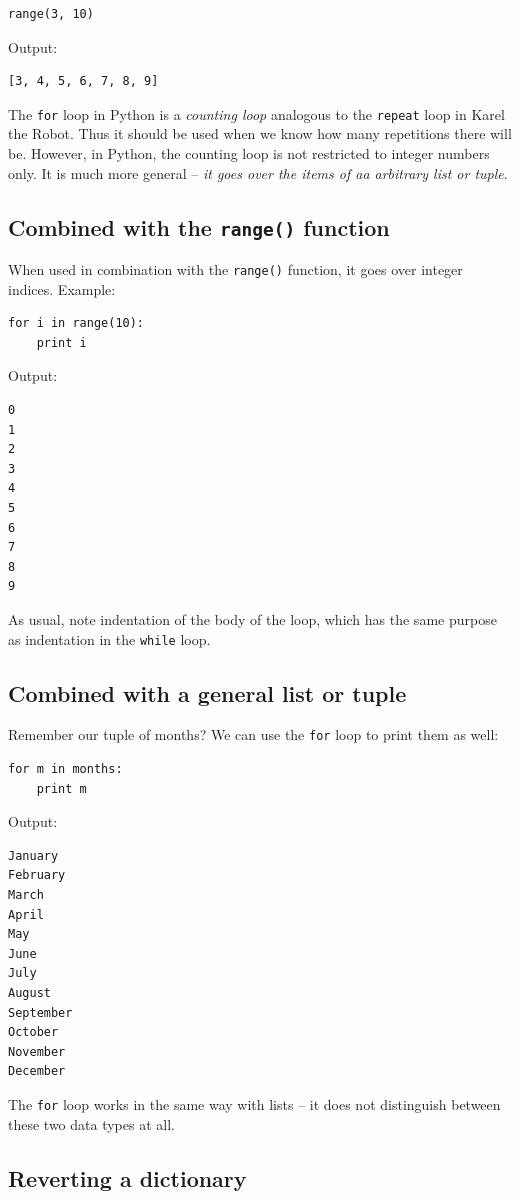 \begin{verbatim}
range(3, 10)
\end{verbatim}
Output:

\begin{verbatim}
[3, 4, 5, 6, 7, 8, 9]
\end{verbatim}
The {\tt for} loop in Python is a {\em counting loop} analogous to the {\tt repeat}
loop in Karel the Robot. Thus it should be used when we know how many repetitions there 
will be. However, in Python, the counting loop is not restricted to integer numbers 
only. It is much more general -- {\em it goes over the items of aa arbitrary list or tuple}. 

\subsection{Combined with the {\tt range()} function}

When used in combination with the {\tt range()} function, it goes over integer indices. 
Example:

\begin{verbatim}
for i in range(10):
    print i
\end{verbatim}
Output:

\begin{verbatim}
0
1
2
3
4
5
6
7
8
9
\end{verbatim}
As usual, note indentation of the body of the loop, which has the same 
purpose as indentation in the {\tt while} loop. 

\subsection{Combined with a general list or tuple}

Remember our tuple of months? We can use the {\tt for} loop to print them as well:

\begin{verbatim}
for m in months:
    print m
\end{verbatim}
Output:

\begin{verbatim}
January
February
March
April
May
June
July
August
September
October
November
December
\end{verbatim}
The {\tt for} loop works in the same way with lists -- it does not distinguish between these 
two data types at all.

\subsection{Reverting a dictionary}

